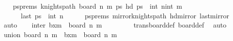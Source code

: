 \begin{isabellebody}
\ \ \isamarkupfalse%
\ psprems{\isacharcolon}{\kern0pt}\ {\isachardoublequoteopen}knights{\isacharunderscore}{\kern0pt}path\ {\isacharparenleft}{\kern0pt}board\ {\isacharparenleft}{\kern0pt}n{\isacharminus}{\kern0pt}{}{\isacharparenright}{\kern0pt}\ m{\isacharparenright}{\kern0pt}\ {\isacharquery}{\kern0pt}ps\ {\isachardoublequoteopen}hd\ {\isacharquery}{\kern0pt}ps\ {\isacharequal}{\kern0pt}\ {\isacharparenleft}{\kern0pt}int\ {\isacharparenleft}{\kern0pt}n{\isacharminus}{\kern0pt}{}{\isacharparenright}{\kern0pt}{\isacharcomma}{\kern0pt}int\ m{\isacharparenright}{\kern0pt}{\isachardoublequoteclose}\ \isanewline
\ \ \ \ \ \ {\isachardoublequoteopen}last\ {\isacharquery}{\kern0pt}ps\ {\isacharequal}{\kern0pt}\ {\isacharparenleft}{\kern0pt}int\ {\isacharparenleft}{\kern0pt}n{\isacharminus}{\kern0pt}{}{\isacharparenright}{\kern0pt}{\isacharminus}{\kern0pt}{}{\isacharcomma}{\kern0pt}{}{\isacharparenright}{\kern0pt}{\isachardoublequoteclose}\isanewline
\ \ \ \ \isamarkupfalse%
\ psprems\ mirror{}{\isacharunderscore}{\kern0pt}knights{\isacharunderscore}{\kern0pt}path\ hd{\isacharunderscore}{\kern0pt}mirror{}\ last{\isacharunderscore}{\kern0pt}mirror{}\ \isamarkupfalse%
\ auto\isanewline
\isanewline
\ \ \isamarkupfalse%
\ inter{\isacharcolon}{\kern0pt}\ {\isachardoublequoteopen}{\isacharquery}{\kern0pt}b{}xm{\isacharprime}{\kern0pt}\ {\isasyminter}\ board\ {\isacharparenleft}{\kern0pt}n{\isacharminus}{\kern0pt}{}{\isacharparenright}{\kern0pt}\ m\ {\isacharequal}{\kern0pt}\ {\isacharbraceleft}{\kern0pt}{\isacharbraceright}{\kern0pt}{\isachardoublequoteclose}\ \isanewline
\ \ \ \ \isamarkupfalse%
\ trans{\isacharunderscore}{\kern0pt}board{\isacharunderscore}{\kern0pt}def\ board{\isacharunderscore}{\kern0pt}def\ \isamarkupfalse%
\ auto\ \isanewline
\isanewline
\ \ \isamarkupfalse%
\ union{\isacharcolon}{\kern0pt}\ {\isachardoublequoteopen}board\ n\ m\ {\isacharequal}{\kern0pt}\ {\isacharquery}{\kern0pt}b{}xm{\isacharprime}{\kern0pt}\ {\isasymunion}\ board\ {\isacharparenleft}{\kern0pt}n{\isacharminus}{\kern0pt}{}{\isacharparenright}{\kern0pt}\ m{\isachardoublequoteclose}\isanewline

\end{isabellebody}
